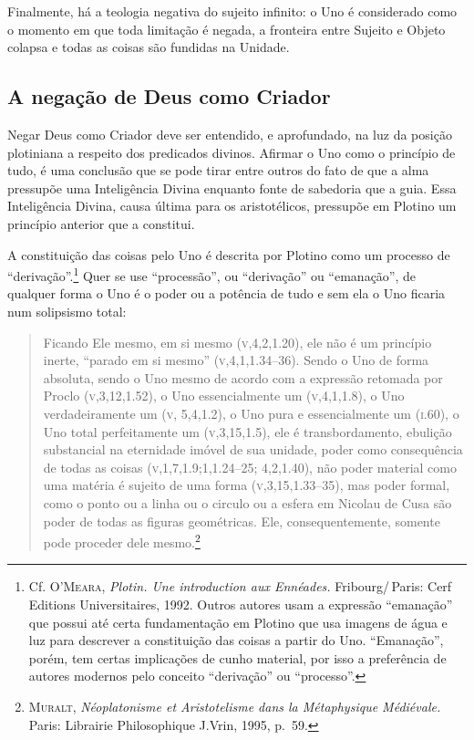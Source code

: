 Finalmente, há a teologia negativa do sujeito infinito: o Uno é considerado
como o momento em que toda limitação é negada, a fronteira entre Sujeito e
Objeto colapsa e todas as coisas são fundidas na Unidade.

\subsection{A negação de Deus como Criador}

Negar Deus como Criador deve ser entendido, e
aprofundado, na luz da posição plotiniana a respeito dos
predicados divinos. Afirmar o Uno como o princípio de tudo, é
uma conclusão que se pode tirar entre outros do fato de que a alma
pressupõe uma Inteligência Divina enquanto fonte de sabedoria
que a guia. Essa Inteligência Divina, causa última para os
aristotélicos, pressupõe em Plotino um princípio anterior que a
constitui. 

A constituição das coisas pelo Uno é descrita por Plotino como um
processo de “derivação”.\footnote{ Cf. \textsc{O'Meara,}
\emph{Plotin. Une introduction aux Ennéades.} Fribourg/\,Paris:
Cerf Editions Universitaires, 1992. Outros autores usam
a expressão “emanação” que possui até certa fundamentação em
Plotino que usa imagens de água e luz para descrever a
constituição das coisas a partir do Uno. “Emanação”, porém, tem
certas implicações de cunho material, por isso a preferência de
autores modernos pelo conceito “derivação” ou “processo”.} Quer
se use “processão”, ou “derivação” ou “emanação”, de qualquer
forma o Uno é o poder ou a potência  de tudo e sem ela o Uno
ficaria num solipsismo total:

\begin{quote}
Ficando Ele mesmo, em si mesmo (\textsc{v},4,2,1.20), ele não é um
princípio inerte, “parado em si mesmo” (\textsc{v},4,1,1.34--36). Sendo o
Uno de forma absoluta, sendo o Uno mesmo de acordo com a
expressão retomada por Proclo (\textsc{v},3,12,1.52), o Uno
essencialmente um (\textsc{v},4,1,1.8), o Uno verdadeiramente um
(\textsc{v},
5,4,1.2), o Uno pura e essencialmente um (\textsc{i}.60), o Uno total
perfeitamente um (\textsc{v},3,15,1.5), ele é transbordamento, ebulição
substancial na eternidade imóvel de sua unidade, poder como
consequência de todas as coisas (\textsc{v},1,7,1.9;1,1.24--25; 4,2,1.40),
não poder material como uma matéria é sujeito de uma forma
(\textsc{v},3,15,1.33--35), mas poder formal, como o ponto ou a linha ou o
circulo ou a esfera em Nicolau de Cusa são poder de todas as
figuras geométricas. Ele, consequentemente, somente pode
proceder dele mesmo.\footnote{ \textsc{Muralt}, 
\emph{Néoplatonisme et Aristotelisme dans la Métaphysique
Médiévale.} Paris: Librairie Philosophique J.Vrin, 1995, p.~59.}
\end{quote}


